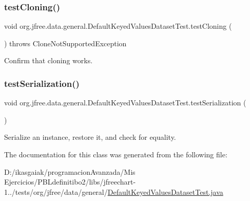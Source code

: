 \subsubsection{\texorpdfstring{test\+Cloning()}{testCloning()}}
{\footnotesize\ttfamily void org.\+jfree.\+data.\+general.\+Default\+Keyed\+Values\+Dataset\+Test.\+test\+Cloning (\begin{DoxyParamCaption}{ }\end{DoxyParamCaption}) throws Clone\+Not\+Supported\+Exception}

Confirm that cloning works. \mbox{\label{classorg_1_1jfree_1_1data_1_1general_1_1_default_keyed_values_dataset_test_a024c2b875baa0156c27ee9dc7ee3ad5c}} 
\subsubsection{\texorpdfstring{test\+Serialization()}{testSerialization()}}
{\footnotesize\ttfamily void org.\+jfree.\+data.\+general.\+Default\+Keyed\+Values\+Dataset\+Test.\+test\+Serialization (\begin{DoxyParamCaption}{ }\end{DoxyParamCaption})}

Serialize an instance, restore it, and check for equality. 

The documentation for this class was generated from the following file\+:\begin{DoxyCompactItemize}
\item 
D\+:/ikasgaiak/programacion\+Avanzada/\+Mis Ejercicios/\+P\+B\+Ldefinitibo2/libs/jfreechart-\/1../tests/org/jfree/data/general/\mbox{\hyperlink{_default_keyed_values_dataset_test_8java}{Default\+Keyed\+Values\+Dataset\+Test.\+java}}\end{DoxyCompactItemize}
